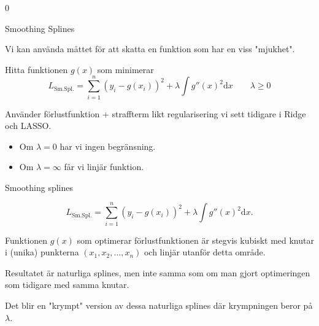 0\documentclass[10pt,english]{beamer}
\begin{document}
\begin{frame}{Smoothing Splines}

    Vi kan använda måttet för att skatta en funktion som har en viss "mjukhet".

    \begin{greenbox}
        Hitta funktionen $g(x)$ som minimerar
        \begin{equation*}
            L_{\text{Sm.Spl.}} = \sum_{i=1}^{n}(y_i - g(x_i))^2 + \lambda \int g''(x)^2 \mathrm{d}x \qquad \lambda \ge 0
        \end{equation*}
    \end{greenbox}
    
    Använder förlustfunktion + straffterm likt regularisering vi sett tidigare i Ridge och LASSO.

    \begin{itemize}
        \item Om $\lambda = 0$ har vi ingen begränsning.
        \item Om $\lambda = \infty$ får vi linjär funktion.
    \end{itemize}
\end{frame}

\begin{frame}{Smoothing splines}

    \begin{equation*}
        L_{\text{Sm.Spl.}} = \sum_{i=1}^{n}(y_i - g(x_i))^2 + \lambda \int g''(x)^2 \mathrm{d}x.
    \end{equation*}

    \begin{bluebox}
        Funktionen $g(x)$ som optimerar förlustfunktionen är stegvis kubiskt med knutar i (unika) punkterna $(x_1, x_2, \ldots, x_n)$ och linjär utanför detta område.
    \end{bluebox}

    Resultatet är naturliga splines, men inte samma som om man gjort optimeringen som tidigare med samma knutar.

    Det blir en "krympt" version av dessa naturliga splines där krympningen beror på $\lambda$.
    
\end{frame}
\end{document}
